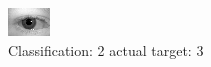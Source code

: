 \begin{figure}[h!]
\begin{center}
\includegraphics[width=0.60\columnwidth]{figures/ID560_class_2_target_3.png}
\end{center}
\caption{ Classification: 2 actual target: 3}
\label{fig:ID560_class_2_target_3}
\end{figure}

